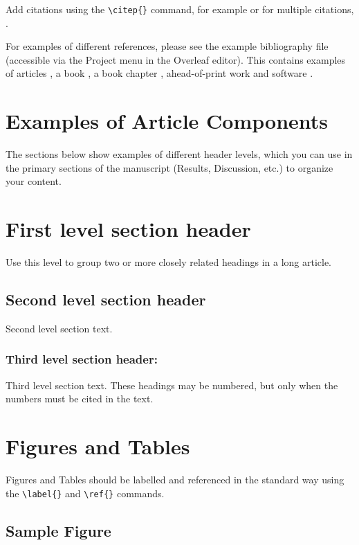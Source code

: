 \documentclass[9pt,twocolumn,twoside]{gsag3jnl}
\begin{document}
Add citations using the \verb|\citep{}| command, for example \citep{neher2013genealogies} or for multiple citations, \citep{neher2013genealogies, rodelsperger2014characterization}.

For examples of different references, please see the example bibliography file (accessible via the Project menu in the Overleaf editor). This contains examples of articles \citep{neher2013genealogies, rodelsperger2014characterization}, a book \citep{Sturtevent2001}, a book chapter \citep{Sturtevent2001chp7}, ahead-of-print work \citep{Starita2015} and software \citep{Kruijer2015}.

\section{Examples of Article Components}
\label{sec:examples}

The sections below show examples of different header levels, which you can use in the primary sections of the manuscript (Results, Discussion, etc.) to organize your content.

\section{First level section header}

Use this level to group two or more closely related headings in a long article.

\subsection{Second level section header}

Second level section text.

\subsubsection{Third level section header:}

Third level section text. These headings may be numbered, but only when the numbers must be cited in the text. 

\section{Figures and Tables}

Figures and Tables should be labelled and referenced in the standard way using the \verb|\label{}| and \verb|\ref{}| commands.

\subsection{Sample Figure}
\end{document}

